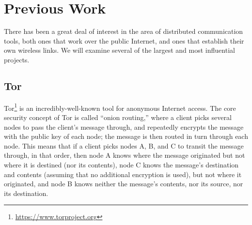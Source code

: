 \documentclass[12pt]{article}
\begin{document}
  \section{Previous Work}
  \label{sec:previouswork}
  
  There has been a great deal of interest in the area of distributed communication tools, both ones that work over the public Internet, and ones that establish their own wireless links. We will examine several of the largest and most influential projects.
  
  \subsection{Tor}
  
  Tor\footnote{\url{https://www.torproject.org}} is an incredibly-well-known tool for anonymous Internet access. The core security concept of Tor is called ``onion routing,'' where a client picks several nodes to pass the client's message through, and repeatedly encrypts the message with the public key of each node; the message is then routed in turn through each node. This means that if a client picks nodes A, B, and C to transit the message through, in that order, then node A knows where the message originated but not where it is destined (nor its contents), node C knows the message's destination and contents (assuming that no additional encryption is used), but not where it originated, and node B knows neither the message's contents, nor its source, nor its destination.
  
\end{document}
